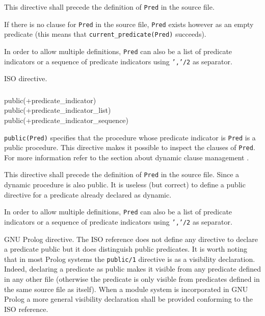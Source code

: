 This directive shall precede the definition of \texttt{Pred} in the source
file.

If there is no clause for \texttt{Pred} in the source file, \texttt{Pred}
exists however as an empty predicate (this means that
\texttt{current\_predicate(Pred)} succeeds).

In order to allow multiple definitions, \texttt{Pred} can also be a list of
predicate indicators or a sequence of predicate indicators using
\texttt{','/2} as separator.

\Portability

ISO directive.

\subsubsection{ \label{public/1}}

\begin{TemplatesOneCol}
public(+predicate\_indicator)\\
public(+predicate\_indicator\_list)\\
public(+predicate\_indicator\_sequence)

\end{TemplatesOneCol}

\Description

\texttt{public(Pred)} specifies that the procedure whose predicate indicator
is \texttt{Pred} is a public procedure. This directive makes it possible to
inspect the clauses of \texttt{Pred}. For more information refer to the
section about dynamic clause management .

This directive shall precede the definition of \texttt{Pred} in the source
file. Since a dynamic procedure is also public. It is useless (but correct)
to define a public directive for a predicate already declared as dynamic.

In order to allow multiple definitions, \texttt{Pred} can also be a list of
predicate indicators or a sequence of predicate indicators using
\texttt{','/2} as separator.

\Portability

GNU Prolog directive. The ISO reference does not define any directive to
declare a predicate public but it does distinguish public predicates. It is
worth noting that in most Prolog systems the \texttt{public/1} directive is
as a visibility declaration. Indeed, declaring a predicate as public makes
it visible from any predicate defined in any other file (otherwise the
predicate is only visible from predicates defined in the same source file as
itself). When a module system is incorporated in GNU Prolog a more general
visibility declaration shall be provided conforming to the ISO reference.

